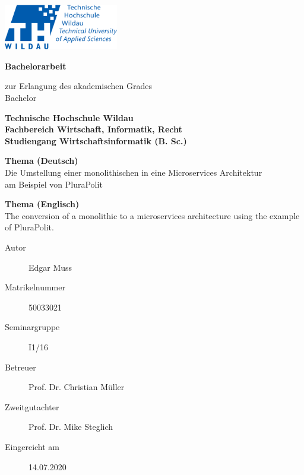 \begin{titlepage}
\begin{center}

\includegraphics[width=5cm,right]{Assets/TH-Wildau-Logo_rgb}

\vspace{1cm}

\textbf{\huge
Bachelorarbeit
}
\vspace{1.3cm}
		
zur Erlangung des akademischen Grades \\
Bachelor

\vspace{2cm}

\textbf{ \large
Technische Hochschule Wildau \\
Fachbereich Wirtschaft, Informatik, Recht \\
Studiengang Wirtschaftsinformatik (B. Sc.)
}

\vspace{1.4cm}

\textbf{Thema (Deutsch)} \\
Die Umstellung einer monolithischen in eine Microservices Architektur \\
am Beispiel von PluraPolit

\vspace{.5cm}

\textbf{Thema (Englisch)} \\
The conversion of a monolithic to a microservices architecture using the example of PluraPolit.

\vspace{1.5cm}

		\end{center}
\begin{description}
	\item [Autor] Edgar Muss
	\item [Matrikelnummer] 50033021
	\item [Seminargruppe] I1/16
	\item [Betreuer] Prof. Dr. Christian Müller
	\item [Zweitgutachter] Prof. Dr. Mike Steglich
	\item [Eingereicht am] 14.07.2020
\end{description}
\end{titlepage}